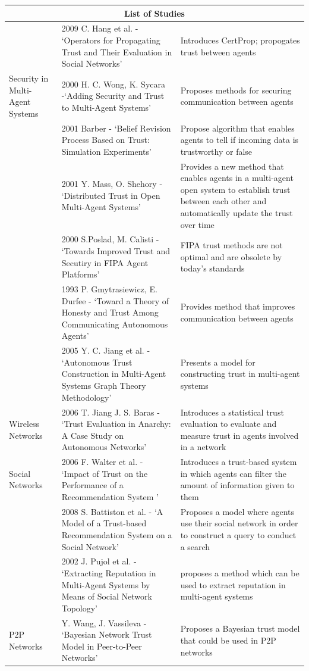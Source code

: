 \documentclass[runningheads,a4paper]{llncs}
\begin{document}
\begin{center}
\begin{tabular}{ |p{2cm}|p{4cm}|p{6cm}|  }
\hline
\multicolumn{3}{|c|}{List of Studies} \\
\hline
 & 2009 C. Hang et al. - `Operators for Propagating Trust and Their Evaluation in Social Networks' & Introduces CertProp; propogates trust between agents\\
\hline
Security in Multi-Agent Systems & 2000 H. C. Wong, K. Sycara -`Adding Security and Trust to Multi-Agent Systems' & Proposes methods for securing communication between agents\\
\hline
 & 2001 Barber - `Belief Revision Process Based on Trust: Simulation Experiments' & Propose algorithm that enables agents to tell if incoming data is trustworthy or false\\
\hline
 & 2001 Y. Mass, O. Shehory - `Distributed Trust in Open Multi-Agent Systems' & Provides a new method that enables agents in a multi-agent open system to establish trust between each other and automatically update the trust over time\\
\hline
 & 2000 S.Poslad, M. Calisti - `Towards Improved Trust and Secutiry in FIPA Agent Platforms' & FIPA trust methods are not optimal and are obsolete by today's standards\\
\hline
 & 1993 P. Gmytrasiewicz, E. Durfee - `Toward a Theory of Honesty and Trust Among Communicating Autonomous Agents' & Provides method that improves communication between agents\\
\hline
 & 2005 Y. C. Jiang et al. - `Autonomous Trust Construction in Multi-Agent Systems Graph Theory Methodology' & Presents a model for constructing trust in multi-agent systems\\
\hline
Wireless Networks & 2006 T. Jiang J. S. Baras - `Trust Evaluation in Anarchy: A Case Study on Autonomous Networks' & Introduces a statistical trust evaluation to evaluate and measure trust in agents involved in a network\\
\hline
Social Networks & 2006 F. Walter et al. - `Impact of Trust on the Performance of a Recommendation System ' & Introduces a trust-based system in which agents can filter the amount of information given to them\\
\hline
 & 2008 S. Battiston et al. - `A Model of a Trust-based Recommendation System on a Social Network' & Proposes a model where agents use their social network in order to construct a query to conduct a search\\
\hline
 & 2002 J. Pujol et al. - `Extracting Reputation in Multi-Agent Systems by Means of Social Network Topology' & proposes a method which can be used to extract reputation in multi-agent systems\\
\hline
P2P Networks & Y. Wang, J. Vassileva - `Bayesian Network Trust Model in Peer-to-Peer Networks' & Proposes a Bayesian trust model that could be used in P2P networks\\
\hline
\end{tabular}

\end{center}
\end{document}
